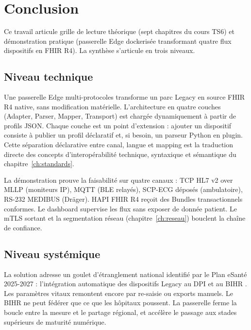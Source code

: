 \chapter*{Conclusion}
\label{ch:conclusion}

Ce travail articule grille de lecture théorique (sept chapitres du cours TS6) et démonstration pratique (passerelle Edge dockerisée transformant quatre flux dispositifs en FHIR R4). La synthèse s'articule en trois niveaux.

\section*{Niveau technique}

Une passerelle Edge multi-protocoles transforme un parc Legacy en source FHIR R4 native, sans modification matérielle. L'architecture en quatre couches (Adapter, Parser, Mapper, Transport) est chargée dynamiquement à partir de profils JSON. Chaque couche est un point d'extension : ajouter un dispositif consiste à publier un profil déclaratif et, si besoin, un parseur Python en plugin. Cette séparation déclarative entre canal, langue et mapping est la traduction directe des concepts d'interopérabilité technique, syntaxique et sémantique du chapitre~\ref{ch:standards}.

La démonstration prouve la faisabilité sur quatre canaux : TCP HL7 v2 over MLLP (moniteurs IP), MQTT (BLE relayés), SCP-ECG déposés (ambulatoire), RS-232 MEDIBUS (Dräger). HAPI FHIR R4 reçoit des Bundles transactionnels conformes. Le dashboard supervise les flux sans exposer de donnée patient. Le mTLS sortant et la segmentation réseau (chapitre~\ref{ch:reseau}) bouclent la chaîne de confiance.

\section*{Niveau systémique}

La solution adresse un goulet d'étranglement national identifié par le Plan eSanté 2025-2027 : l'intégration automatique des dispositifs Legacy au DPI et au BIHR \cite{plan_esante_2025_2027,bihr_overview}. Les paramètres vitaux remontent encore par re-saisie ou exports manuels. Le BIHR ne peut fédérer que ce que les hôpitaux poussent. La passerelle ferme la boucle entre la mesure et le partage régional, et accélère le passage aux stades supérieurs de maturité numérique.

